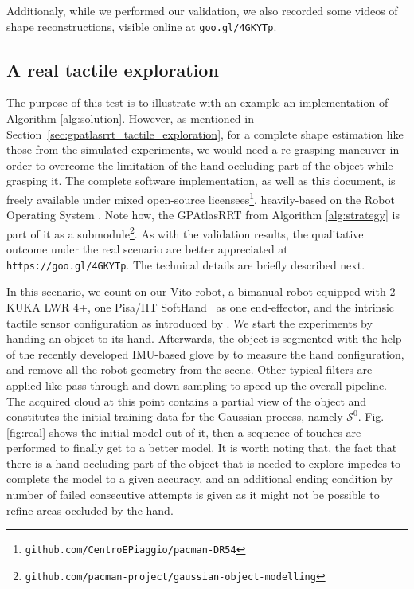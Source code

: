Additionaly, while we performed our validation, we also recorded some videos of shape reconstructions, visible online at \texttt{goo.gl/4GKYTp}.

\vspace{-2em}
\subsection{A real tactile exploration}
\label{sec:real}

The purpose of this test is to illustrate with an example an implementation of Algorithm \ref{alg:solution}. However, as mentioned in Section~\ref{sec:gpatlasrrt_tactile_exploration}, for a complete shape estimation like those from  the simulated experiments, we would need a re-grasping maneuver in order to overcome the limitation of the hand occluding part of the object while grasping it. The complete software implementation, as well as this document, is freely available under mixed open-source licensees\footnote{\texttt{github.com/CentroEPiaggio/pacman-DR54}}, heavily-based on the Robot Operating System \citet{ROS}. Note how, the GPAtlasRRT from Algorithm \ref{alg:strategy} is part of it as a submodule\footnote{\texttt{github.com/pacman-project/gaussian-object-modelling}}. As with the validation results, the qualitative outcome under the real scenario are better appreciated at \texttt{https://goo.gl/4GKYTp}. The technical details are briefly described next.

In this scenario, we count on our Vito robot, a bimanual robot equipped with 2 KUKA LWR 4+, one Pisa/IIT SoftHand~\citet{Catalano2014Adaptive} as one end-effector, and the intrinsic tactile sensor configuration as introduced by \citet{Rosales2014Active}. We start the experiments by handing an object to its hand. Afterwards, the object is segmented with the help of the recently developed IMU-based glove by \citet{Santaera2015Lowcost} to measure the hand configuration, and remove all the robot geometry from the scene. Other typical filters are applied like pass-through and down-sampling to speed-up the overall pipeline. The acquired cloud at this point contains a partial view of the object and constitutes the initial training data for the Gaussian process, namely $\mathcal{S}^0$. Fig. \ref{fig:real} shows the initial model out of it, then a sequence of touches are performed to finally get to a better model. It is worth noting that, the fact that there is a hand occluding part of the object that is needed to explore impedes to complete the model to a given accuracy, and an additional ending condition by number of failed consecutive attempts is given as it might not be possible to refine areas occluded by the hand.

